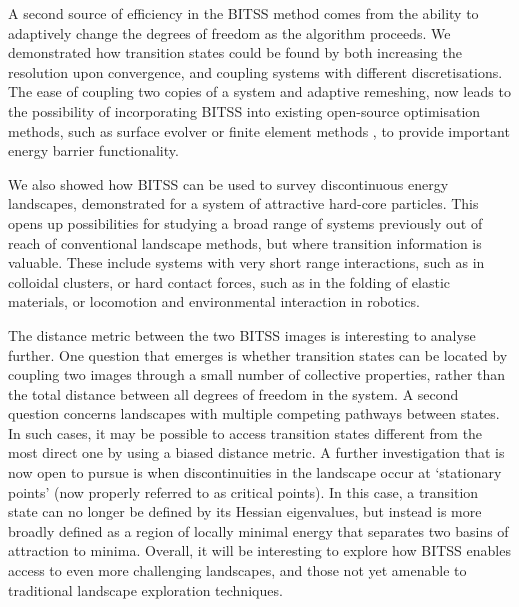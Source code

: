 A second source of efficiency in the BITSS method comes from the ability to adaptively change the degrees of freedom as the algorithm proceeds.
We demonstrated how transition states could be found by both increasing the resolution upon convergence, and coupling systems with different discretisations.
The ease of coupling two copies of a system and adaptive remeshing, now leads to the possibility of incorporating BITSS into existing open-source optimisation methods, such as surface evolver \cite{Brakke1992} or finite element methods \cite{Kolev2021}, to provide important energy barrier functionality.

We also showed how BITSS can be used to survey discontinuous energy landscapes, demonstrated for a system of attractive hard-core particles.
This opens up possibilities for studying a broad range of systems previously out of reach of conventional landscape methods, but where transition information is valuable.
These include systems with very short range interactions, such as in colloidal clusters, or hard contact forces, such as in the folding of elastic materials, or locomotion and environmental interaction in robotics.

The distance metric between the two BITSS images is interesting to analyse further.
One question that emerges is whether transition states can be located by coupling two images through a small number of collective properties, rather than the total distance between all degrees of freedom in the system.
A second question concerns landscapes with multiple competing pathways between states.
In such cases, it may be possible to access transition states different from the most direct one by using a biased distance metric.
A further investigation that is now open to pursue is when discontinuities in the landscape occur at `stationary points' (now properly referred to as critical points).
In this case, a transition state can no longer be defined by its Hessian eigenvalues, but instead is more broadly defined as a region of locally minimal energy that separates two basins of attraction to minima.
Overall, it will be interesting to explore how BITSS enables access to even more challenging landscapes, and those not yet amenable to traditional landscape exploration techniques.

